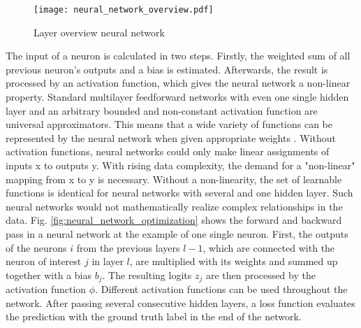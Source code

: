 \begin{figure}[H]
  \centering
  \texttt{[image: neural\_network\_overview.pdf]}
  \caption {Layer overview neural network}
  \label{fig:neural_network_overview}
\end{figure}
The input of a neuron is calculated in two steps. Firstly, the weighted sum of all previous neuron's outputs and a bias is estimated. Afterwards, the result is processed by an activation function, which gives the neural network a non-linear property. Standard multilayer feedforward networks with even one single hidden layer and an arbitrary bounded and non-constant activation function are universal approximators. This means that a wide variety of functions can be represented by the neural network when given appropriate weights \cite{HORNIK1991}. Without activation functions, neural networks could only make linear assignments of inputs x to outputs y. With rising data complexity, the demand for a "non-linear" mapping from x to y is necessary. Without a non-linearity, the set of learnable functions is identical for neural networks with several and one hidden layer. Such neural networks would not mathematically realize complex relationships in the data. Fig. \ref{fig:neural_network_optimization} shows the forward and backward pass in a neural network at the example of one single neuron. First, the outputs of the neurons $i$ from the previous layers $l-1$, which are connected with the neuron of interest $j$ in layer $l$, are multiplied with its weights and summed up together with a bias $b_{j}$. The resulting logits $z_{j}$ are then processed by the activation function $\phi$. Different activation functions can be used throughout the network. After passing several consecutive hidden layers, a loss function evaluates the prediction with the ground truth label in the end of the network.

